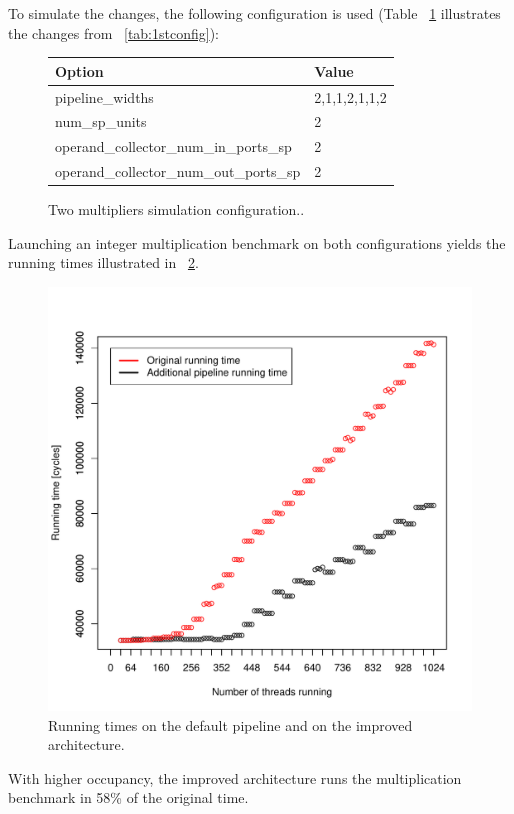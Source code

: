 \documentclass{report}
\begin{document}
    To simulate the changes, the following configuration is used (Table ~\ref{tab:2ndconfig}
    illustrates the changes from ~\ref{tab:1stconfig}):
    \begin{figure}[H]
    \centering
        \begin{tabular}{ | l | l | }
    	    \hline
    	    Option & Value \\ \hline
    	    pipeline\_widths & 2,1,1,2,1,1,2 \\
            num\_sp\_units & 2 \\
            operand\_collector\_num\_in\_ports\_sp & 2 \\
            operand\_collector\_num\_out\_ports\_sp & 2 \\ \hline
  	    \end{tabular}
  	\captionsetup{justification=centering}
  	\caption{Two multipliers simulation configuration..}
  	\label{tab:2ndconfig}
    \end{figure}

    Launching an integer multiplication benchmark on both configurations yields the running
    times illustrated in ~\ref{fig:time_improvement}. 
    \begin{figure}[H]
    \centering
        \includegraphics[width=0.7\linewidth]{graphics/improvement-graph}
        \captionsetup{justification=centering}
        \caption{Running times on the default pipeline and on the improved architecture.}
        \label{fig:time_improvement}
    \end{figure}
    
    With higher occupancy, the improved architecture runs the multiplication benchmark in 58\% of the original time.
\end{document}

